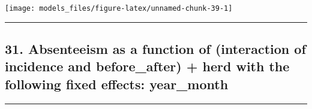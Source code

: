 \documentclass[]{article}
\begin{document}
\begin{center}\texttt{[image: models\_files/figure-latex/unnamed-chunk-39-1]} \end{center}

\newpage

\begin{center}\rule{0.5\linewidth}{\linethickness}\end{center}

\subsection{31. Absenteeism as a function of (interaction of incidence
and before\_after) + herd with the following fixed effects:
year\_month}\label{absenteeism-as-a-function-of-interaction-of-incidence-and-before_after-herd-with-the-following-fixed-effects-year_month}

\begin{center}\rule{0.5\linewidth}{\linethickness}\end{center}
\end{document}
